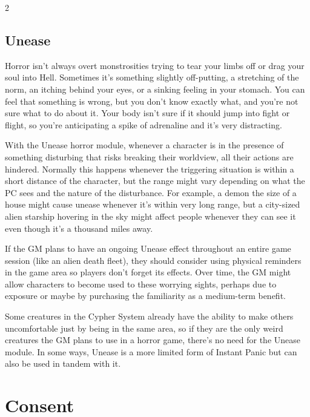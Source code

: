 \begin{multicols}{2}

\newpage

\section{Unease}

Horror isn’t always overt monstrosities trying to tear your limbs off or drag your soul into Hell. Sometimes it’s something slightly off-putting, a stretching of the norm, an itching behind your eyes, or a sinking feeling in your stomach. You can feel that something is wrong, but you don’t know exactly what, and you’re not sure what to do about it. Your body isn’t sure if it should jump into fight or flight, so you’re anticipating a spike of adrenaline and it’s very distracting.

With the Unease horror module, whenever a character is in the presence of something disturbing that risks breaking their worldview, all their actions are hindered. Normally this happens whenever the triggering situation is within a short distance of the character, but the range might vary depending on what the PC sees and the nature of the disturbance. For example, a demon the size of a house might cause unease whenever it’s within very long range, but a city-sized alien starship hovering in the sky might affect people whenever they can see it even though it’s a thousand miles away.

If the GM plans to have an ongoing Unease effect throughout an entire game session (like an alien death fleet), they should consider using physical reminders in the game area so players don’t forget its effects. Over time, the GM might allow characters to become used to these worrying sights, perhaps due to exposure or maybe by purchasing the familiarity as a medium-term benefit.

Some creatures in the Cypher System already have the ability to make others uncomfortable just by being in the same area, so if they are the only weird creatures the GM plans to use in a horror game, there’s no need for the Unease module.
In some ways, Unease is a more limited form of Instant Panic but can also be used in tandem with it.

\chapter{Consent}


\end{multicols}
